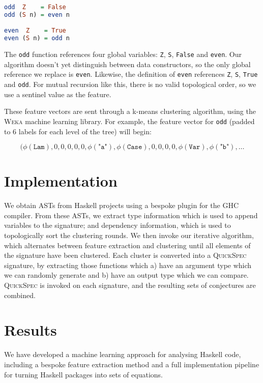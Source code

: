 \documentclass[]{sig-alternate}
\newcommand{\feature}[1]{\phi(#1)}
\newcommand{\id}[1]{\texttt{"#1"}}
\newcommand{\CVar}{\texttt{Var}}
\newcommand{\CLam}{\texttt{Lam}}
\newcommand{\CCase}{\texttt{Case}}
\begin{document}
\begin{lstlisting}[language=Haskell]
odd  Z    = False
odd (S n) = even n

even  Z    = True
even (S n) = odd n
\end{lstlisting}

The \texttt{odd} function references four global variables: \texttt{Z}, \texttt{S}, \texttt{False} and \texttt{even}. Our algorithm doesn't yet distinguish between data constructors, so the only global reference we replace is \texttt{even}. Likewise, the definition of \texttt{even} references \texttt{Z}, \texttt{S}, \texttt{True} and \texttt{odd}. For mutual recursion like this, there is no valid topological order, so we use a sentinel value as the feature.

These feature vectors are sent through a k-means clustering algorithm, using the \textsc{Weka} machine learning library. For example, the feature vector for \texttt{odd} (padded to 6 labels for each level of the tree) will begin:

\begin{equation*}
  (\feature{\CLam}, 0, 0, 0, 0, 0, \feature{\id{a}}, \feature{\CCase}, 0, 0, 0, 0, \feature{\CVar}, \feature{\id{b}}, \dots
\end{equation*}

\section{Implementation}\label{implementation}

We obtain ASTs from Haskell projects using a bespoke plugin for the GHC
compiler. From these ASTs, we extract type information which is used to append variables to the signature; and dependency information, which is used to topologically sort the clustering rounds. We then invoke our iterative algorithm, which alternates between feature extraction and clustering until all elements of the signature have been clustered. Each cluster is converted into a \textsc{QuickSpec} signature, by extracting those functions which a) have an argument type which we can randomly generate and b) have an output type which we can compare. \textsc{QuickSpec} is invoked on each signature, and the resulting sets of conjectures are combined.

\section{Results}\label{results}

We have developed a machine learning approach for analysing Haskell code, including a
bespoke feature extraction method and a full implementation pipeline for turning Haskell packages into sets of equations.
\end{document}
